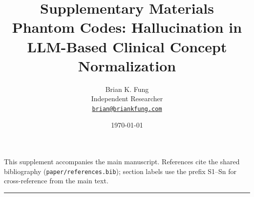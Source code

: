 \documentclass[11pt]{article}
\title{%
  Supplementary Materials \\
  \large Phantom Codes: Hallucination in LLM-Based Clinical Concept Normalization}
\author{%
  Brian K. Fung \\[2pt]
  \small Independent Researcher \\[2pt]
  \small\href{mailto:brian@briankfung.com}{\texttt{brian@briankfung.com}}}
\date{\today}
\begin{document}
\maketitle

\noindent
This supplement accompanies the main manuscript. References cite the
shared bibliography (\texttt{paper/references.bib}); section labels use
the prefix S1--Sn for cross-reference from the main text.

\tableofcontents
\bigskip







\bigskip
\hrule
\bigskip

\printbibliography[heading=bibintoc, title={References}]
\end{document}
